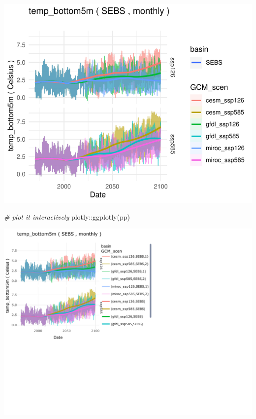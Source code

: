 \documentclass[
]{article}
\newenvironment{Shaded}{\begin{snugshade}}{\end{snugshade}}
\newcommand{\CommentTok}[1]{\textcolor[rgb]{0.56,0.35,0.01}{\textit{#1}}}
\newcommand{\FunctionTok}[1]{\textcolor[rgb]{0.00,0.00,0.00}{#1}}
\newcommand{\NormalTok}[1]{#1}
\newcommand{\SpecialCharTok}[1]{\textcolor[rgb]{0.00,0.00,0.00}{#1}}
\begin{document}
\begin{center}\includegraphics{ACLIM2_quickStart_files/figure-latex/ewe-2} \end{center}

\begin{Shaded}
\begin{Highlighting}[]
  \CommentTok{\# plot it interactively}
\NormalTok{  plotly}\SpecialCharTok{::}\FunctionTok{ggplotly}\NormalTok{(pp)}
\end{Highlighting}
\end{Shaded}

\begin{center}\includegraphics{ACLIM2_quickStart_files/figure-latex/unnamed-chunk-6-1} \end{center}
\end{document}
